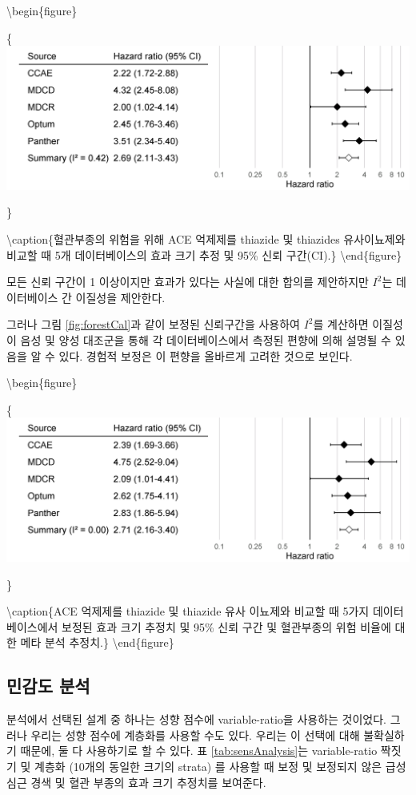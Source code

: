 \documentclass[11pt]{book}
\theoremstyle{definition}
\theoremstyle{definition}
\theoremstyle{definition}
\theoremstyle{remark}
\begin{document}
\textbackslash{}begin\{figure\}

\{\centering \includegraphics[width=0.9\linewidth]{images/MethodValidity/forest}

\}

\textbackslash{}caption\{혈관부종의 위험을 위해 ACE 억제제를 thiazide 및
thiazides 유사이뇨제와 비교할 때 5개 데이터베이스의 효과 크기 추정 및
95\% 신뢰 구간(CI).\}\label{fig:forest} \textbackslash{}end\{figure\}

모든 신뢰 구간이 1 이상이지만 효과가 있다는 사실에 대한 합의를
제안하지만 \(I^2\)는 데이터베이스 간 이질성을 제안한다.

그러나 그림 \ref{fig:forestCal}과 같이 보정된 신뢰구간을 사용하여
\(I^2\)를 계산하면 이질성이 음성 및 양성 대조군을 통해 각
데이터베이스에서 측정된 편향에 의해 설명될 수 있음을 알 수 있다. 경험적
보정은 이 편향을 올바르게 고려한 것으로 보인다.

\textbackslash{}begin\{figure\}

\{\centering \includegraphics[width=0.9\linewidth]{images/MethodValidity/forestCal}

\}

\textbackslash{}caption\{ACE 억제제를 thiazide 및 thiazide 유사 이뇨제와
비교할 때 5가지 데이터베이스에서 보정된 효과 크기 추정치 및 95\% 신뢰
구간 및 혈관부종의 위험 비율에 대한 메타 분석 추정치.\}\label{fig:forestCal}
\textbackslash{}end\{figure\}

\subsection{민감도 분석}\label{--1}

분석에서 선택된 설계 중 하나는 성향 점수에 variable-ratio을 사용하는
것이었다. 그러나 우리는 성향 점수에 계층화를 사용할 수도 있다. 우리는 이
선택에 대해 불확실하기 때문에, 둘 다 사용하기로 할 수 있다. 표
\ref{tab:sensAnalysis}는 variable-ratio 짝짓기 및 계층화 (10개의 동일한
크기의 strata) 를 사용할 때 보정 및 보정되지 않은 급성 심근 경색 및 혈관
부종의 효과 크기 추정치를 보여준다.
\end{document}
